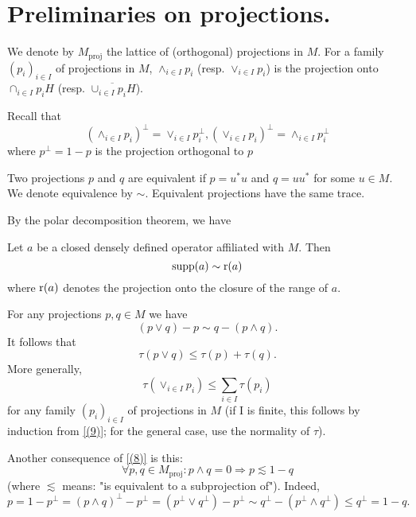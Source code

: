\section*{Preliminaries on projections.}
We denote by $M_{\text{proj}}$ the lattice of (orthogonal) projections in $M$. For a family $(p_i)_{i\in I}$ of projections in $M$, $\wedge_{i\in I}p_i$ (resp. $\vee_{i\in I}p_i$) is the projection onto $\cap_{i\in I}p_iH$ (resp. $\overline{\cup_{i\in I}p_iH}$).\par
Recall that
\begin{equation}
    (\wedge_{i\in I}p_i)^\perp=\vee_{i\in I}p_i^\perp, (\vee_{i\in I}p_i)^\perp=\wedge_{i\in I}p_i^\perp
\end{equation}
where $p^\perp=1-p$ is the projection orthogonal to $p$\par
Two projections $p$ and $q$ are equivalent if $p=u^*u$ and $q=uu^*$ for some $u\in M$. We denote equivalence by $\sim$. Equivalent projections have the same trace.\par
By the polar decomposition theorem, we have
\begin{lemma}
    Let $a$ be a closed densely defined operator affiliated
with $M$. Then
\[
    \operatorname{supp}(a)\sim \operatorname{r}(a)
\]
where $\operatorname{r}(a)$ denotes the projection onto the closure of the range of $a$.
\end{lemma}
For any projections $p,q\in M$ we have
\begin{equation}\label{(8)}
    (p\vee q)-p\sim q-(p\wedge q).
\end{equation}
It follows that
\begin{equation}\label{(9)}
    \tau(p\vee q)\leq \tau(p)+\tau(q).
\end{equation}
More generally,
\begin{equation}
    \tau(\vee_{i\in I}p_i)\leq \sum_{i\in I}\tau(p_i)
\end{equation}
for any family $(p_i)_{i\in I}$ of projections in $M$ (if I is finite, this follows by induction from \eqref{(9)}; for the general case, use the normality of $\tau$).\par
Another consequence of \eqref{(8)} is this:
\begin{equation}\label{(11)}
    \forall p,q\in M_{\text{proj}}: p\wedge q=0\Rightarrow p\lesssim 1-q
\end{equation}
(where $\lesssim$ means: "is equivalent to a subprojection of"). Indeed,
\[
    p=1-p^\perp=(p\wedge q)^\perp-p^\perp=(p^\perp\vee q^\perp)-p^\perp\sim q^\perp-(p^\perp \wedge q^\perp)\leq q^\perp=1-q.
\]
